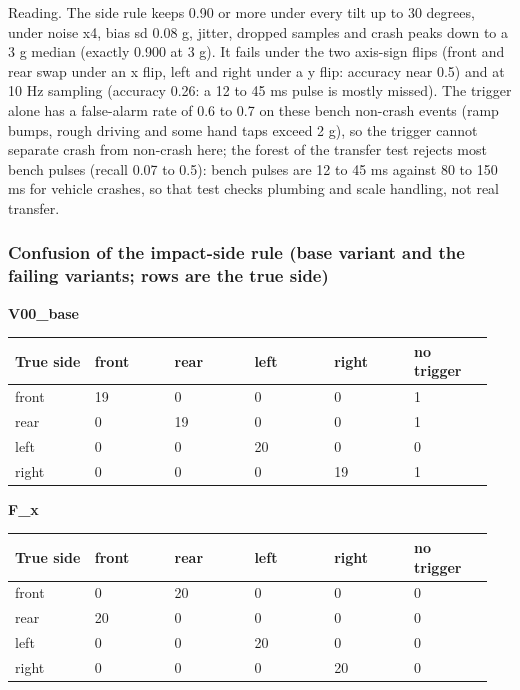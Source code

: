Reading. The side rule keeps 0.90 or more under every tilt up to 30 degrees, under noise x4, bias sd 0.08 g, jitter, dropped samples and crash peaks down to a 3 g median (exactly 0.900 at 3 g). It fails under the two axis-sign flips (front and rear swap under an x flip, left and right under a y flip: accuracy near 0.5) and at 10 Hz sampling (accuracy 0.26: a 12 to 45 ms pulse is mostly missed). The trigger alone has a false-alarm rate of 0.6 to 0.7 on these bench non-crash events (ramp bumps, rough driving and some hand taps exceed 2 g), so the trigger cannot separate crash from non-crash here; the forest of the transfer test rejects most bench pulses (recall 0.07 to 0.5): bench pulses are 12 to 45 ms against 80 to 150 ms for vehicle crashes, so that test checks plumbing and scale handling, not real transfer.

\subsubsection*{Confusion of the impact-side rule (base variant and the failing variants; rows are the true side)}

\textbf{V00\_base}

{\scriptsize\raggedright
\begin{longtable}{p{0.158\linewidth}p{0.158\linewidth}p{0.158\linewidth}p{0.158\linewidth}p{0.158\linewidth}p{0.158\linewidth}}
\toprule
True side & front & rear & left & right & no trigger \\
\midrule
\endhead
front & 19 & 0 & 0 & 0 & 1 \\
rear & 0 & 19 & 0 & 0 & 1 \\
left & 0 & 0 & 20 & 0 & 0 \\
right & 0 & 0 & 0 & 19 & 1 \\
\bottomrule
\end{longtable}}

\textbf{F\_x}

{\scriptsize\raggedright
\begin{longtable}{p{0.158\linewidth}p{0.158\linewidth}p{0.158\linewidth}p{0.158\linewidth}p{0.158\linewidth}p{0.158\linewidth}}
\toprule
True side & front & rear & left & right & no trigger \\
\midrule
\endhead
front & 0 & 20 & 0 & 0 & 0 \\
rear & 20 & 0 & 0 & 0 & 0 \\
left & 0 & 0 & 20 & 0 & 0 \\
right & 0 & 0 & 0 & 20 & 0 \\
\bottomrule
\end{longtable}}

